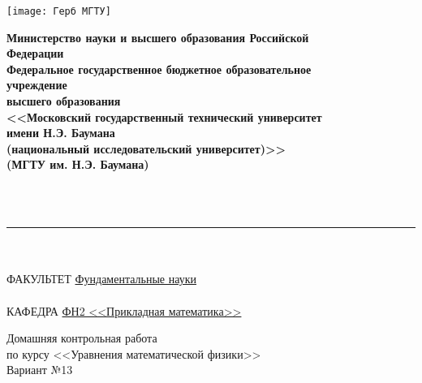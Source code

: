 \begin{minipage}{0.2\linewidth}
    \texttt{[image: Герб МГТУ]}
\end{minipage}
\begin{minipage}{0.8\linewidth}
    \begin{center}
        \begin{singlespace}
            \textbf{Министерство науки и высшего образования Российской \\ Федерации \\ Федеральное государственное бюджетное образовательное \\ учреждение \\ высшего образования \\ <<Московский государственный технический университет \\ имени Н.Э. Баумана \\ (национальный исследовательский университет)>> \\ (МГТУ им. Н.Э. Баумана)}
        \end{singlespace}
    \end{center}
\end{minipage}
\\
\\
\rule{\linewidth}{2pt} %
\\
\\
ФАКУЛЬТЕТ \underline{\hspace{0.28\linewidth} Фундаментальные науки \hspace{0.28\linewidth}}
\\
\\
КАФЕДРА \underline{\hspace{0.26\linewidth} ФН2 <<Прикладная математика>> \hspace{0.26\linewidth}}
\\
\vspace{3.5cm}
\begin{center}
    \begin{minipage}{0.8\linewidth}
        \begin{center}
            \large Домашняя контрольная работа \\ по курсу <<Уравнения математической физики>>
            \\[10pt]
            \large Вариант №13
        \end{center}
    \end{minipage}
\end{center}
